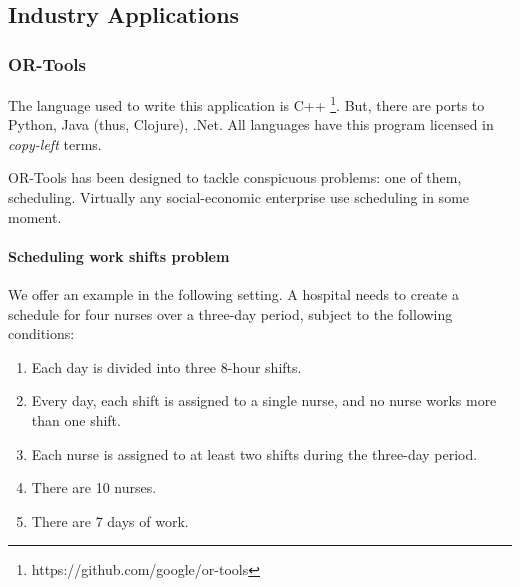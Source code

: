 \documentclass[
12pt,				%
openright,			%
oneside,			%
a4paper,			%
brazil,				%
english,			%
]{abntex2}
\begin{document}
\subsection{Industry Applications}

\subsubsection{OR-Tools}
The language used to write this application is C++ \footnote{https://github.com/google/or-tools}. But,
there are ports to Python, Java (thus, Clojure), .Net. All languages
have this program licensed in \textit{copy-left} terms.

OR-Tools has been designed to tackle conspicuous problems: one of them,
scheduling. Virtually any social-economic enterprise use scheduling in
some moment.

\paragraph{Scheduling work shifts problem}
We offer an example in the following setting. A hospital needs to create a schedule for four nurses over a three-day period, subject to the following conditions:

\begin{enumerate}
\item Each day is divided into three 8-hour shifts.
\item Every day, each shift is assigned to a single nurse, and no
  nurse works more than one shift.
\item Each nurse is assigned to at least two shifts during the
  three-day period.
\item There are 10 nurses.
\item There are 7 days of work.
\end{enumerate}
\end{document}
